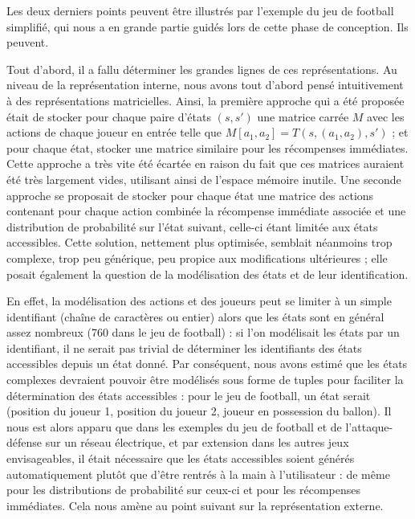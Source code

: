 \documentclass{article}
\begin{document}
Les deux derniers points peuvent être illustrés par l'exemple du jeu de football simplifié, qui nous a en grande partie guidés lors de cette phase de conception. Ils peuvent.

Tout d'abord, il a fallu déterminer les grandes lignes de ces représentations. Au niveau de la représentation interne, nous avons tout d'abord pensé intuitivement à des représentations matricielles. Ainsi, la première approche qui a été proposée était de stocker pour chaque paire d'états \((s, s')\) une matrice carrée \(M\) avec les actions de chaque joueur en entrée telle que \(M[a_1, a_2] = T(s, (a_1, a_2), s')\) ; et pour chaque état, stocker une matrice similaire pour les récompenses immédiates. Cette approche a très vite été écartée en raison du fait que ces matrices auraient été très largement vides, utilisant ainsi de l'espace mémoire inutile. Une seconde approche se proposait de stocker pour chaque état une matrice des actions contenant pour chaque action combinée la récompense immédiate associée et une distribution de probabilité sur l'état suivant, celle-ci étant limitée aux états accessibles. Cette solution, nettement plus optimisée, semblait néanmoins trop complexe, trop peu générique, peu propice aux modifications ultérieures ; elle posait également la question de la modélisation des états et de leur identification.

En effet, la modélisation des actions et des joueurs peut se limiter à un simple identifiant (chaîne de caractères ou entier) alors que les états sont en général assez nombreux (760 dans le jeu de football) : si l'on modélisait les états par un identifiant, il ne serait pas trivial de déterminer les identifiants des états accessibles depuis un état donné. Par conséquent, nous avons estimé que les états complexes devraient pouvoir être modélisés sous forme de tuples pour faciliter la détermination des états accessibles : pour le jeu de football, un état serait (position du joueur 1, position du joueur 2, joueur en possession du ballon). Il nous est alors apparu que dans les exemples du jeu de football et de l'attaque-défense sur un réseau électrique, et par extension dans les autres jeux envisageables, il était nécessaire que les états accessibles soient générés automatiquement plutôt que d'être rentrés à la main à l'utilisateur : de même pour les distributions de probabilité sur ceux-ci et pour les récompenses immédiates. Cela nous amène au point suivant sur la représentation externe.
\end{document}
